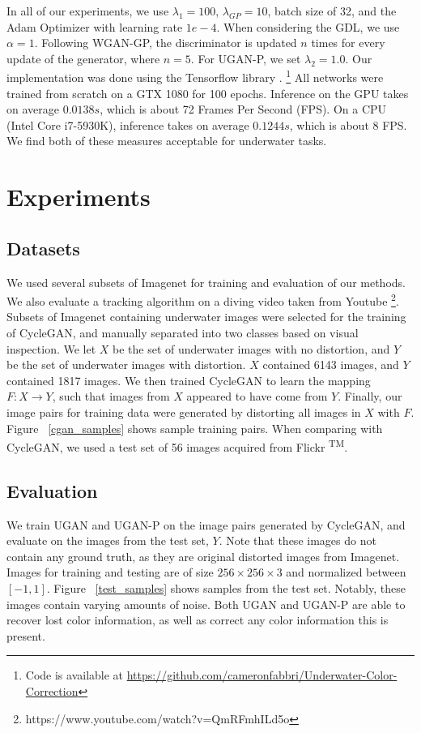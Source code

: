 \documentclass[letterpaper, 10pt, conference]{ieeeconf}
\begin{document}
In all of our experiments, we use $\lambda_{1} = 100$, $\lambda_{GP} = 10$, batch size of 32, and the Adam Optimizer
\cite{kingma2014adam} with learning rate $1e-4$. When considering the GDL, we use $\alpha = 1$. Following WGAN-GP, the discriminator is updated $n$ times for every
update of the generator, where $n = 5$. For UGAN-P, we set $\lambda_{2} = 1.0$. Our implementation was done using the
Tensorflow library \cite{abadi2016tensorflow}.
\footnote{Code is available at \url{https://github.com/cameronfabbri/Underwater-Color-Correction}}
All networks were trained from scratch on a GTX 1080 for 100 epochs. Inference on the GPU takes on average $ 0.0138s$,
which is about 72 Frames Per Second (FPS). On a CPU (Intel Core i7-5930K), inference takes on average $ 0.1244s$, which
is about 8 FPS. We find both of these measures acceptable for underwater tasks.

\section{Experiments}
\subsection{Datasets}
We used several subsets of Imagenet \cite{deng2009imagenet} for training and evaluation of our methods. We also
evaluate a tracking algorithm on a diving video taken from Youtube
\footnote{https://www.youtube.com/watch?v=QmRFmhILd5o}. Subsets of Imagenet containing underwater images
were selected for the training of CycleGAN, and manually separated into two classes based on visual inspection. We let
$X$ be the set of
underwater images with no distortion, and $Y$ be the set of underwater images with distortion. $X$ contained 6143
images, and $Y$ contained 1817 images. We then trained CycleGAN to learn the mapping $F: X \rightarrow Y$, such that
images from $X$ appeared to have come from $Y$. Finally, our image pairs for training data were generated by distorting
all images in $X$ with $F$. Figure ~\ref{cgan_samples} shows sample training pairs. When comparing with CycleGAN, we used a test set
of 56 images acquired from Flickr \textsuperscript{TM}.

\subsection{Evaluation}
We train UGAN and UGAN-P on the image pairs generated by CycleGAN, and evaluate on the images from the
test set, $Y$. Note that these images do not contain any ground truth, as they are original distorted images from
Imagenet. Images for training and testing are of size $256 \times 256 \times 3$ and normalized between $[-1, 1]$.
Figure ~\ref{test_samples} shows samples from the test set. Notably, these images contain varying amounts of noise. Both UGAN and UGAN-P
are able to recover lost color information, as well as correct any color information this is present. 
\end{document}
